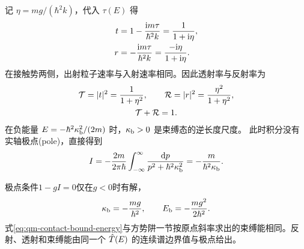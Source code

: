 记 $\eta = mg/(\hbar^2k)$，代入 $\tau(E)$ 得
\begin{subequations}
    \begin{align}
        t &= 1 - \frac{\mathrm{i} m\tau}{\hbar^2k} = \frac1{1 + \mathrm{i}\eta},\\
        r &= -\frac{\mathrm{i} m\tau}{\hbar^2k} = \frac{-\mathrm{i}\eta}{1 + \mathrm{i}\eta}.
    \end{align}
\end{subequations}
在接触势两侧，出射粒子速率与入射速率相同。因此透射率与反射率为
\begin{subequations}
    \begin{gather}
        \mathcal T = \lvert t\rvert^2 = \frac{1}{1 + \eta^2},\qquad
        \mathcal R = \lvert r\rvert^2 = \frac{\eta^2}{1 + \eta^2},\\
        \mathcal T + \mathcal R = 1.
    \end{gather}
\end{subequations}
在负能量 $E = -\hbar^2\kappa_{\mathrm{b}}^2/(2m)$ 时，$\kappa_{\mathrm{b}} > 0$ 是束缚态的逆长度尺度。
此时积分没有实轴极点(pole)，直接得到
\begin{equation}
    I = -\frac{2m}{2\pi\hbar}
    \int_{-\infty}^\infty\frac{\mathop{}\!\mathrm{d} p}{p^2 + \hbar^2\kappa_{\mathrm{b}}^2}
    = -\frac{m}{\hbar^2\kappa_{\mathrm{b}}}.
\end{equation}

极点条件$1 - gI = 0$仅在$g < 0$时有解，
\begin{equation}
    \label{eq:qm-contact-bound-energy}
    \kappa_{\mathrm{b}} = -\frac{mg}{\hbar^2},\qquad E_{\mathrm{b}} = -\frac{mg^2}{2\hbar^2}.
\end{equation}
式\eqref{eq:qm-contact-bound-energy}与方势阱一节按原点斜率求出的束缚能相同。反射、透射和束缚能由同一个 $\hat{T}(E)$ 的连续谱边界值与极点给出。

